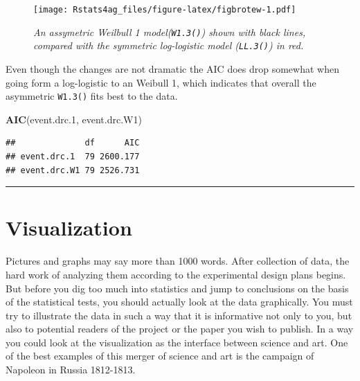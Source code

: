 \documentclass[letterpaper,]{book}
\newenvironment{Shaded}{\begin{snugshade}}{\end{snugshade}}
\newcommand{\FloatTok}[1]{\textcolor[rgb]{0.00,0.00,0.81}{#1}}
\newcommand{\KeywordTok}[1]{\textcolor[rgb]{0.13,0.29,0.53}{\textbf{#1}}}
\newcommand{\NormalTok}[1]{#1}
\begin{document}
\begin{figure}
\centering
\texttt{[image: Rstats4ag\_files/figure-latex/figbrotew-1.pdf]}
\caption{\label{fig:figbrotew}\emph{An assymetric Weilbull 1 model(\texttt{W1.3()}) shown with black lines, compared with the symmetric log-logistic model (\texttt{LL.3()}) in red.}}
\end{figure}

Even though the changes are not dramatic the AIC does drop somewhat when going form a log-logistic to an Weibull 1, which indicates that overall the asymmetric \texttt{W1.3()} fits best to the data.

\begin{Shaded}
\begin{Highlighting}[]
\KeywordTok{AIC}\NormalTok{(event.drc}\FloatTok{.1}\NormalTok{, event.drc.W1)}
\end{Highlighting}
\end{Shaded}

\begin{verbatim}
##              df      AIC
## event.drc.1  79 2600.177
## event.drc.W1 79 2526.731
\end{verbatim}

\begin{center}\rule{0.5\linewidth}{0.5pt}\end{center}

\hypertarget{visualization}{%
\chapter{Visualization}\label{visualization}}

Pictures and graphs may say more than 1000 words. After collection of data, the hard work of analyzing them according to the experimental design plans begins. But before you dig too much into statistics and jump to conclusions on the basis of the statistical tests, you should actually look at the data graphically. You must try to illustrate the data in such a way that it is informative not only to you, but also to potential readers of the project or the paper you wish to publish. In a way you could look at the visualization as the interface between science and art. One of the best examples of this merger of science and art is the campaign of Napoleon in Russia 1812-1813.
\end{document}
